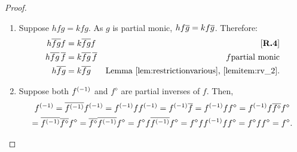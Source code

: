 \begin{proof}
  \prepprooflist
  \begin{enumerate}[{(}i{)}]
    \item Suppose $h f g = k f g$. As $g$ is partial monic, $h f \overline{g} = k f \overline{g}$.
      Therefore:
      \begin{align*}
        h \overline{f g} f &= k \overline{f g} f &[\text{\bfseries {R}.{4}}]\\
        h \overline{f g}\,\overline{f} &= k \overline{f g}\, \overline{f} & f\text{partial monic}\\
        h \overline{f g}&= k \overline{f g} & \text{Lemma \ref{lem:restrictionvarious},
          \ref{lemitem:rv_2}.}
      \end{align*}
    \item Suppose both ${f}^{(-1)}$ and $f^{\diamond}$ are partial inverses of $f$. Then,
      \begin{multline*}
        \inv{f}
        = \restr{\inv{f}}\inv{f} %
        =\inv{f}f\inv{f}  %
        = \inv{f} \restr{f}   %
        = \inv{f} f f^{\diamond}   %
        = \inv{f} f \restr{f^{\diamond}} f^{\diamond}  \\ %
        = \restr{\inv{f}}\restr{f^{\diamond}} f^{\diamond}   %
        = \restr{f^{\diamond}}\restr{\inv{f}} f^{\diamond} %
        = f^{\diamond} f \restr{\inv{f}}  f^{\diamond} %
        = f^{\diamond} f \inv{f} f f^{\diamond} %
        = f^{\diamond} f f^{\diamond} %
        = f^{\diamond}. %

\end{multline*}
\end{enumerate}
\end{proof}
